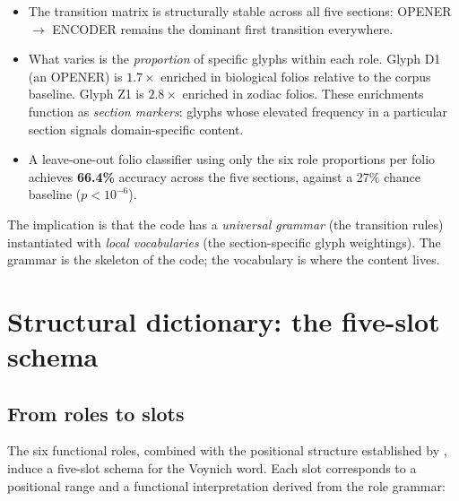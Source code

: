 \begin{itemize}[nosep]
  \item The transition matrix is structurally stable across all five
    sections: OPENER $\to$ ENCODER remains the dominant first transition
    everywhere.
  \item What varies is the \emph{proportion} of specific glyphs within
    each role. Glyph D1 (an OPENER) is $1.7\times$ enriched in
    biological folios relative to the corpus baseline. Glyph Z1 is
    $2.8\times$ enriched in zodiac folios. These enrichments function
    as \emph{section markers}: glyphs whose elevated frequency in a
    particular section signals domain-specific content.
  \item A leave-one-out folio classifier using only the six role
    proportions per folio achieves \textbf{66.4\%} accuracy across the
    five sections, against a 27\% chance baseline ($p < 10^{-6}$).
\end{itemize}

The implication is that the code has a \emph{universal grammar} (the
transition rules) instantiated with \emph{local vocabularies} (the
section-specific glyph weightings). The grammar is the skeleton of the
code; the vocabulary is where the content lives.


\section{Structural dictionary: the five-slot schema}
\label{sec:structural_dict}

\subsection{From roles to slots}

The six functional roles, combined with the positional structure
established by \silpart, induce a five-slot schema for the Voynich
word. Each slot corresponds to a positional range and a functional
interpretation derived from the role grammar:

